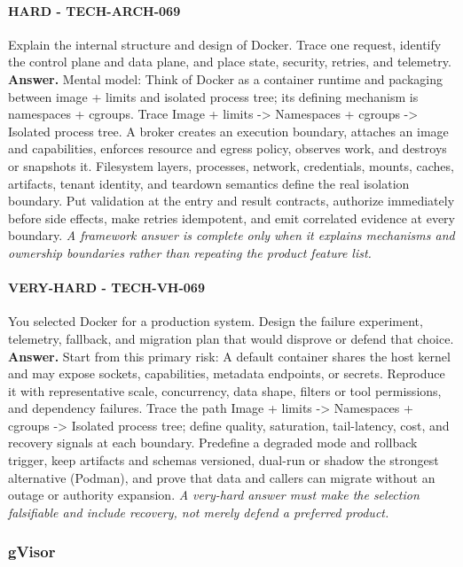 \paragraph{HARD - TECH-ARCH-069} Explain the internal structure and design of Docker. Trace one request, identify the control plane and data plane, and place state, security, retries, and telemetry.
\textbf{Answer.} Mental model: Think of Docker as a container runtime and packaging between image + limits and isolated process tree; its defining mechanism is namespaces + cgroups. Trace Image + limits -> Namespaces + cgroups -> Isolated process tree. A broker creates an execution boundary, attaches an image and capabilities, enforces resource and egress policy, observes work, and destroys or snapshots it. Filesystem layers, processes, network, credentials, mounts, caches, artifacts, tenant identity, and teardown semantics define the real isolation boundary. Put validation at the entry and result contracts, authorize immediately before side effects, make retries idempotent, and emit correlated evidence at every boundary.
\textit{A framework answer is complete only when it explains mechanisms and ownership boundaries rather than repeating the product feature list.}
\paragraph{VERY-HARD - TECH-VH-069} You selected Docker for a production system. Design the failure experiment, telemetry, fallback, and migration plan that would disprove or defend that choice.
\textbf{Answer.} Start from this primary risk: A default container shares the host kernel and may expose sockets, capabilities, metadata endpoints, or secrets. Reproduce it with representative scale, concurrency, data shape, filters or tool permissions, and dependency failures. Trace the path Image + limits -> Namespaces + cgroups -> Isolated process tree; define quality, saturation, tail-latency, cost, and recovery signals at each boundary. Predefine a degraded mode and rollback trigger, keep artifacts and schemas versioned, dual-run or shadow the strongest alternative (Podman), and prove that data and callers can migrate without an outage or authority expansion.
\textit{A very-hard answer must make the selection falsifiable and include recovery, not merely defend a preferred product.}
\subsubsection*{gVisor}
